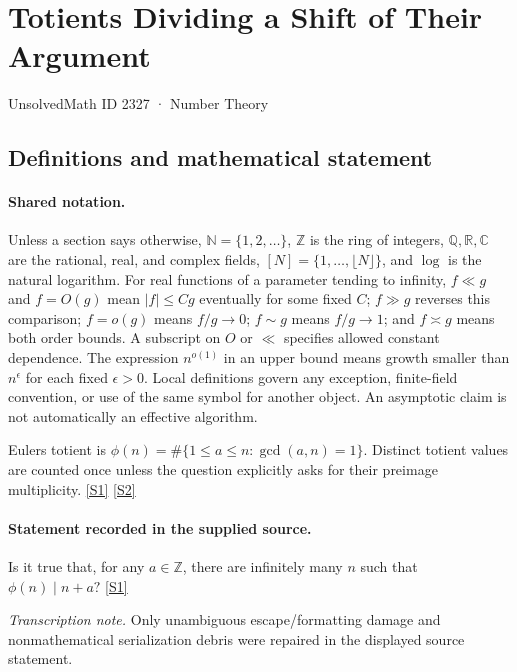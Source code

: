 \documentclass[11pt,a4paper]{article}
\newcommand{\N}{\mathbb{N}}
\newcommand{\Z}{\mathbb{Z}}
\newcommand{\Q}{\mathbb{Q}}
\newcommand{\R}{\mathbb{R}}
\newcommand{\C}{\mathbb{C}}
\newcommand{\sref}[2]{\hyperlink{source:#1:#2}{[S#2]}}
\begin{document}

\setcounter{section}{2326}

\section{Totients Dividing a Shift of Their Argument}\label{2327}

{\small\sffamily UnsolvedMath ID 2327 · Number Theory}

\subsection{Definitions and mathematical statement}

\paragraph{Shared notation.}Unless a section says otherwise, $\N=\{1,2,\ldots\}$,
$\Z$ is the ring of integers, $\Q,\R,\C$ are the rational, real, and complex
fields, $[N]=\{1,\ldots,\lfloor N\rfloor\}$, and $\log$ is the natural
logarithm. For real functions of a parameter tending to infinity,
$f\ll g$ and $f=O(g)$ mean $|f|\leq Cg$ eventually for some fixed $C$;
$f\gg g$ reverses this comparison; $f=o(g)$ means $f/g\to0$;
$f\sim g$ means $f/g\to1$; and $f\asymp g$ means both order bounds.
A subscript on $O$ or $\ll$ specifies allowed constant dependence.
The expression $n^{o(1)}$ in an upper bound means growth smaller than
$n^\epsilon$ for each fixed $\epsilon>0$. Local definitions govern any
exception, finite-field convention, or use of the same symbol for another
object. An asymptotic claim is not automatically an effective algorithm.



Euler\textquotesingle s totient is $\phi(n)=\#\{1\leq a\leq n:\gcd(a,n)=1\}$. Distinct totient values are counted once unless the question explicitly asks for their preimage multiplicity. \sref{2327}{1} \sref{2327}{2}

\paragraph{Statement recorded in the supplied source.}
Is it true that, for any $a\in\mathbb{Z}$, there are infinitely many $n$ such that $ \phi(n) \mid n+a? $ \sref{2327}{1}

{\small\emph{Transcription note.} Only unambiguous escape/formatting damage and nonmathematical serialization debris were repaired in the displayed source statement.}
\end{document}
